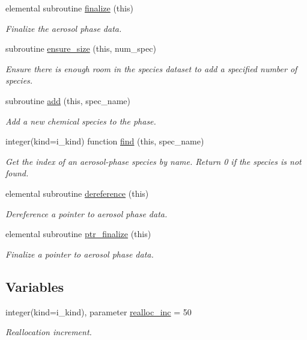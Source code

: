 \begin{DoxyCompactItemize}
elemental subroutine \mbox{\hyperlink{namespacepmc__aero__phase__data_afa8f1027a2929a80901a441153ea704f}{finalize}} (this)
\begin{DoxyCompactList}\small\item\em Finalize the aerosol phase data. \end{DoxyCompactList}\item 
subroutine \mbox{\hyperlink{namespacepmc__aero__phase__data_a0e833fb6dbec3aecaf272f07e0138663}{ensure\+\_\+size}} (this, num\+\_\+spec)
\begin{DoxyCompactList}\small\item\em Ensure there is enough room in the species dataset to add a specified number of species. \end{DoxyCompactList}\item 
subroutine \mbox{\hyperlink{namespacepmc__aero__phase__data_a9f7ffba2277f5781a13e1c9eb6a688e6}{add}} (this, spec\+\_\+name)
\begin{DoxyCompactList}\small\item\em Add a new chemical species to the phase. \end{DoxyCompactList}\item 
integer(kind=i\+\_\+kind) function \mbox{\hyperlink{namespacepmc__aero__phase__data_ae63c2f36492266db6cf4e737997689b9}{find}} (this, spec\+\_\+name)
\begin{DoxyCompactList}\small\item\em Get the index of an aerosol-\/phase species by name. Return 0 if the species is not found. \end{DoxyCompactList}\item 
elemental subroutine \mbox{\hyperlink{namespacepmc__aero__phase__data_a4fe52583490828dad2d1b882b951679d}{dereference}} (this)
\begin{DoxyCompactList}\small\item\em Dereference a pointer to aerosol phase data. \end{DoxyCompactList}\item 
elemental subroutine \mbox{\hyperlink{namespacepmc__aero__phase__data_a4359879599442b607e51b52cab95fab2}{ptr\+\_\+finalize}} (this)
\begin{DoxyCompactList}\small\item\em Finalize a pointer to aerosol phase data. \end{DoxyCompactList}\end{DoxyCompactItemize}
\subsection*{Variables}
\begin{DoxyCompactItemize}
\item 
integer(kind=i\+\_\+kind), parameter \mbox{\hyperlink{namespacepmc__aero__phase__data_a6d8f1bd0204f0436584df39dd4af35aa}{realloc\+\_\+inc}} = 50
\begin{DoxyCompactList}\small\item\em Reallocation increment. \end{DoxyCompactList}\end{DoxyCompactItemize}


